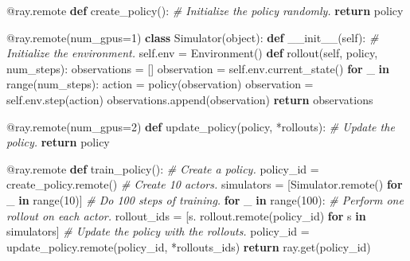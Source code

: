 \documentclass[
]{article}
\newenvironment{Shaded}{}{}
\newcommand{\AttributeTok}[1]{\textcolor[rgb]{0.49,0.56,0.16}{#1}}
\newcommand{\BuiltInTok}[1]{\textcolor[rgb]{0.00,0.50,0.00}{#1}}
\newcommand{\CommentTok}[1]{\textcolor[rgb]{0.38,0.63,0.69}{\textit{#1}}}
\newcommand{\ControlFlowTok}[1]{\textcolor[rgb]{0.00,0.44,0.13}{\textbf{#1}}}
\newcommand{\DecValTok}[1]{\textcolor[rgb]{0.25,0.63,0.44}{#1}}
\newcommand{\FunctionTok}[1]{\textcolor[rgb]{0.02,0.16,0.49}{#1}}
\newcommand{\KeywordTok}[1]{\textcolor[rgb]{0.00,0.44,0.13}{\textbf{#1}}}
\newcommand{\NormalTok}[1]{#1}
\newcommand{\OperatorTok}[1]{\textcolor[rgb]{0.40,0.40,0.40}{#1}}
\newcommand{\VariableTok}[1]{\textcolor[rgb]{0.10,0.09,0.49}{#1}}
\begin{document}
\begin{Shaded}
\begin{Highlighting}[]
\AttributeTok{@ray.remote}
\KeywordTok{def}\NormalTok{ create\_policy():}
    \CommentTok{\# Initialize the policy randomly.}
    \ControlFlowTok{return}\NormalTok{ policy}

\AttributeTok{@ray.remote}\NormalTok{(num\_gpus}\OperatorTok{=}\DecValTok{1}\NormalTok{)}
\KeywordTok{class}\NormalTok{ Simulator(}\BuiltInTok{object}\NormalTok{):}
    \KeywordTok{def} \FunctionTok{\_\_init\_\_}\NormalTok{(}\VariableTok{self}\NormalTok{):}
    \CommentTok{\# Initialize the environment.}
    \VariableTok{self}\NormalTok{.env }\OperatorTok{=}\NormalTok{ Environment()}
    \KeywordTok{def}\NormalTok{ rollout(}\VariableTok{self}\NormalTok{, policy, num\_steps):}
\NormalTok{    observations }\OperatorTok{=}\NormalTok{ []}
\NormalTok{    observation }\OperatorTok{=} \VariableTok{self}\NormalTok{.env.current\_state()}
    \ControlFlowTok{for}\NormalTok{ \_ }\KeywordTok{in} \BuiltInTok{range}\NormalTok{(num\_steps):}
\NormalTok{    action }\OperatorTok{=}\NormalTok{ policy(observation)}
\NormalTok{    observation }\OperatorTok{=} \VariableTok{self}\NormalTok{.env.step(action)}
\NormalTok{    observations.append(observation)}
    \ControlFlowTok{return}\NormalTok{ observations}

\AttributeTok{@ray.remote}\NormalTok{(num\_gpus}\OperatorTok{=}\DecValTok{2}\NormalTok{)}
\KeywordTok{def}\NormalTok{ update\_policy(policy, }\OperatorTok{*}\NormalTok{rollouts):}
    \CommentTok{\# Update the policy.}
    \ControlFlowTok{return}\NormalTok{ policy}

\AttributeTok{@ray.remote}
\KeywordTok{def}\NormalTok{ train\_policy():}
    \CommentTok{\# Create a policy.}
\NormalTok{    policy\_id }\OperatorTok{=}\NormalTok{ create\_policy.remote()}
    \CommentTok{\# Create 10 actors.}
\NormalTok{    simulators }\OperatorTok{=}\NormalTok{ [Simulator.remote() }\ControlFlowTok{for}\NormalTok{ \_ }\KeywordTok{in} \BuiltInTok{range}\NormalTok{(}\DecValTok{10}\NormalTok{)]}
    \CommentTok{\# Do 100 steps of training.}
    \ControlFlowTok{for}\NormalTok{ \_ }\KeywordTok{in} \BuiltInTok{range}\NormalTok{(}\DecValTok{100}\NormalTok{):}
    \CommentTok{\# Perform one rollout on each actor.}
\NormalTok{    rollout\_ids }\OperatorTok{=}\NormalTok{ [s. rollout.remote(policy\_id)}
    \ControlFlowTok{for}\NormalTok{ s }\KeywordTok{in}\NormalTok{ simulators]}
    \CommentTok{\# Update the policy with the rollouts.}
\NormalTok{    policy\_id }\OperatorTok{=}\NormalTok{ update\_policy.remote(policy\_id, }\OperatorTok{*}\NormalTok{rollouts\_ids)}
    \ControlFlowTok{return}\NormalTok{ ray.get(policy\_id) }
\end{Highlighting}
\end{Shaded}
\end{document}
